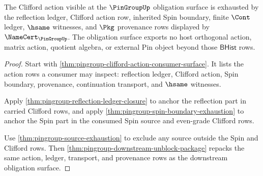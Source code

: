 \begin{theorem}
\label{thm:pingroup-clifford-action-ledger-obligation}
The Clifford action visible at the $\PinGroupUp$ obligation surface is
exhausted by the reflection ledger, Clifford action row, inherited Spin
boundary, finite $\Cont$ ledger, $\hsame$ witnesses, and $\Pkg$ provenance
rows displayed by $\NameCert_{\PinGroupUp}$. The obligation surface exports
no host orthogonal action, matrix action, quotient algebra, or external Pin
object beyond those $\mathsf{BHist}$ rows.
\end{theorem}
\begin{proof}
Start with \autoref{thm:pingroup-clifford-action-consumer-surface}. It lists
the action rows a consumer may inspect: reflection ledger, Clifford action,
Spin boundary, provenance, continuation transport, and $\hsame$ witnesses.

Apply \autoref{thm:pingroup-reflection-ledger-closure} to anchor the
reflection part in carried Clifford rows, and apply
\autoref{thm:pingroup-spin-boundary-exhaustion} to anchor the Spin part in
the consumed Spin source and even-grade Clifford rows.

Use \autoref{thm:pingroup-source-exhaustion} to exclude any source outside
the Spin and Clifford rows. Then
\autoref{thm:pingroup-downstream-unblock-package} repacks the same action,
ledger, transport, and provenance rows as the downstream obligation surface.
\end{proof}
